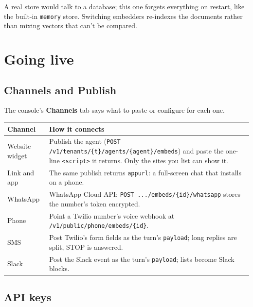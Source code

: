 \documentclass[11pt,a4paper]{article}
\newcommand{\codeus}{\textunderscore\allowbreak}
\newcommand{\code}[1]{{\renewcommand{\_}{\codeus}\texttt{\upshape #1}}}
\begin{document}
\begin{note}
A real store would talk to a database; this one forgets everything on restart, like the built-in
\code{memory} store. Switching embedders re-indexes the documents rather than mixing vectors that can't be
compared.
\end{note}

\section{Going live}

\subsection{Channels and Publish}

The console's \textbf{Channels} tab says what to paste or configure for each one.

\begin{center}
\small
\begin{tabularx}{\textwidth}{@{}L{3.2cm}Y@{}}
\toprule
\textbf{Channel} & \textbf{How it connects} \\
\midrule
Website widget & Publish the agent (\code{POST /v1/tenants/\{t\}/agents/\{agent\}/embeds}) and paste the one-line
  \code{<script>} it returns. Only the sites you list can show it. \\
Link and app & The same publish returns \code{app\_url}: a full-screen chat that installs on a phone. \\
WhatsApp & WhatsApp Cloud API: \code{POST .../embeds/\{id\}/whatsapp} stores the number's token encrypted. \\
Phone & Point a Twilio number's voice webhook at \code{/v1/public/phone/embeds/\{id\}}. \\
SMS & Post Twilio's form fields as the turn's \code{payload}; long replies are split, STOP is answered. \\
Slack & Post the Slack event as the turn's \code{payload}; lists become Slack blocks. \\
\bottomrule
\end{tabularx}
\end{center}

\subsection{API keys}
\end{document}
